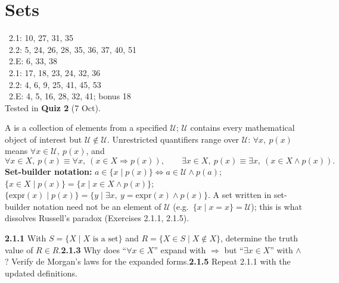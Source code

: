 \chapter{Sets}
%
{\fE\ 2.1: 10, 27, 31, 35\\ \fE\ 2.2: 5, 24, 26, 28, 35, 36, 37, 40, 51\\ \fE\ 2.E: 6, 33, 38\\ \fR\ 2.1: 17, 18, 23, 24, 32, 36\\ \fR\ 2.2: 4, 6, 9, 25, 41, 45, 53\\ \fR\ 2.E: 4, 5, 16, 28, 32, 41; bonus 18\\ Tested in \textbf{Quiz 2} (7 Oct).}


\begin{key}
A  is a collection of elements from a specified  $\mathcal U$; $\mathcal U$ contains every mathematical object of interest but $\mathcal U\notin\mathcal U$. Unrestricted quantifiers range over $\mathcal U$: $\forall x,\ p(x)$ means $\forall x\in\mathcal U,\ p(x)$, and
\[
\forall x\in X,\ p(x)\equiv\forall x,\ (x\in X\Rightarrow p(x)),\qquad \exists x\in X,\ p(x)\equiv\exists x,\ (x\in X\wedge p(x)).
\]
\textbf{Set-builder notation:} $a\in\{x\mid p(x)\}\Leftrightarrow a\in\mathcal U\wedge p(a)$; $\{x\in X\mid p(x)\}=\{x\mid x\in X\wedge p(x)\}$; $\{\mathrm{expr}(x)\mid p(x)\}=\{y\mid\exists x,\ y=\mathrm{expr}(x)\wedge p(x)\}$. A set written in set-builder notation need not be an element of $\mathcal U$ (e.g.\ $\{x\mid x=x\}=\mathcal U$); this is what dissolves Russell's paradox (Exercises 2.1.1, 2.1.5).
\end{key}

\begin{trybox}[{2.1.1, 2.1.3, 2.1.5 \fO}]
\textbf{2.1.1} With $S=\{X\mid X\text{ is a set}\}$ and $R=\{X\in S\mid X\notin X\}$, determine the truth value of $R\in R$.\quad \textbf{2.1.3} Why does ``$\forall x\in X$'' expand with $\Rightarrow$ but ``$\exists x\in X$'' with $\wedge$? Verify de Morgan's laws for the expanded forms.\quad \textbf{2.1.5} Repeat 2.1.1 with the updated definitions.
\end{trybox}

